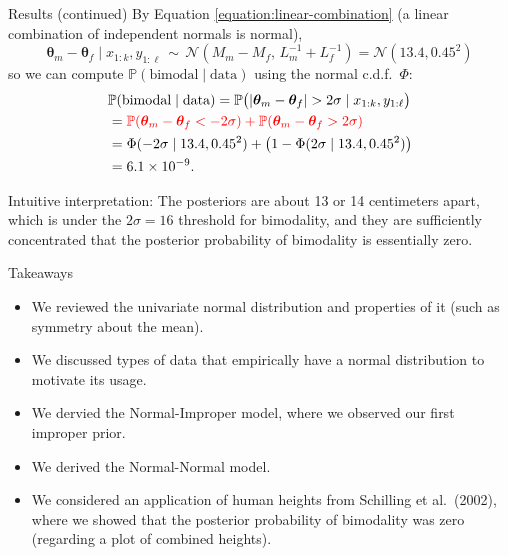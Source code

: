 \documentclass[
  ignorenonframetext,
]{beamer}
\providecommand{\tightlist}{%
  \setlength{\itemsep}{0pt}\setlength{\parskip}{0pt}}
\newcommand{\btheta}{{\bm\theta}}
\renewcommand{\Pr}{\mathbb{P}}
\newcommand{\N}{\mathcal{N}}
\begin{document}
\begin{frame}{Results (continued)}
\protect\hypertarget{results-continued-1}{}
By Equation \ref{equation:linear-combination} (a linear combination of
independent normals is normal),
\[\btheta_m-\btheta_f\mid x_{1:k},y_{1:\ell}\,\sim\,\N(M_m-M_f,\, L_m^{-1} + L_f^{-1}) = \N(13.4,0.45^2) \]
so we can compute \(\Pr(\text{bimodal}\mid \text{data})\) using the
normal c.d.f.~\(\Phi\): \begin{align*}
&\Pr(\text{bimodal}\mid \text{data})= \Pr\big(|\btheta_m-\btheta_f|>2\sigma \mid x_{1:k},y_{1:\ell}\big) \\
&= \textcolor{red}{\Pr(\btheta_m-\btheta_f < -2 \sigma) + \Pr(\btheta_m-\btheta_f > 2 \sigma)} \\
&= \Phi(-2\sigma\mid 13.4,0.45^2)
+ \big(1-\Phi(2\sigma\mid 13.4,0.45^2)\big)\\
& = 6.1\times 10^{-9}.
\end{align*}

Intuitive interpretation: The posteriors are about 13 or 14 centimeters
apart, which is under the \(2\sigma = 16\) threshold for bimodality, and
they are sufficiently concentrated that the posterior probability of
bimodality is essentially zero.
\end{frame}

\begin{frame}{Takeaways}
\protect\hypertarget{takeaways}{}
\begin{itemize}
\tightlist
\item
  We reviewed the univariate normal distribution and properties of it
  (such as symmetry about the mean).
\item
  We discussed types of data that empirically have a normal distribution
  to motivate its usage.
\item
  We dervied the Normal-Improper model, where we observed our first
  improper prior.
\item
  We derived the Normal-Normal model.
\item
  We considered an application of human heights from Schilling et
  al.~(2002), where we showed that the posterior probability of
  bimodality was zero (regarding a plot of combined heights).
\end{itemize}
\end{frame}
\end{document}
